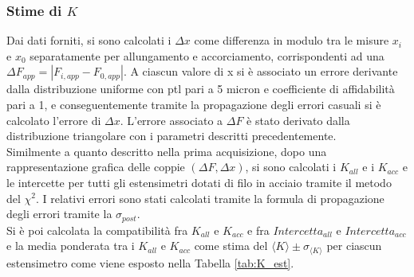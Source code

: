 \documentclass[a4paper,11pt,oneside]{article}
\begin{document}
\subsubsection*{Stime di $K$}
Dai dati forniti, si sono calcolati i $\Delta x$ come differenza in modulo tra le misure $x_i$ e $x_0$ separatamente per allungamento e accorciamento, corrispondenti ad una $\Delta F_{app} =\left | F_{i, app} - F_{0, app} \right |$. A ciascun valore di x si è associato un errore derivante dalla distribuzione uniforme con ptl pari a 5 micron e coefficiente di affidabilità pari a 1, e conseguentemente tramite la propagazione degli errori casuali si è calcolato l'errore di  $\Delta x$. L'errore associato a $\Delta F$ è stato derivato dalla distribuzione triangolare con i parametri descritti precedentemente.\\
Similmente a quanto descritto nella prima acquisizione, dopo una rappresentazione grafica delle coppie $(\Delta F, \Delta x)$, si sono calcolati i $K_{all}$ e i $K_{acc}$ e le intercette per tutti gli estensimetri dotati di filo in acciaio tramite il metodo del $\chi^2$. I relativi errori sono stati calcolati  tramite la formula di propagazione degli errori tramite la $\sigma_{post}$.\\
Si è poi calcolata la compatibilità fra $K_{all}$ e $K_{acc}$ e fra $Intercetta_{all}$ e $Intercetta_{acc}$ e la media ponderata tra i $K_{all}$ e $K_{acc}$ come stima del ${\langle K \rangle }\pm \sigma_{{\langle K\rangle }}$ per ciascun estensimetro come viene esposto nella Tabella \ref{tab:K_est}.
\end{document}
